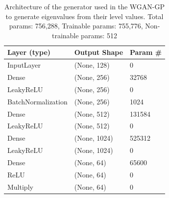 \documentclass{article}
\begin{document}
\begin{table}[]
    \begin{tabular}{|l|l|l|}
        \hline
        \textbf{Layer (type)} & \textbf{Output Shape} & \textbf{Param \#} \\ \hline
        InputLayer            & (None, 128)           & 0                 \\ \hline
        Dense                 & (None, 256)           & 32768             \\ \hline
        LeakyReLU             & (None, 256)           & 0                 \\ \hline
        BatchNormalization    & (None, 256)           & 1024              \\ \hline
        Dense                 & (None, 512)           & 131584            \\ \hline
        LeakyReLU             & (None, 512)           & 0                 \\ \hline
        Dense                 & (None, 1024)          & 525312            \\ \hline
        LeakyReLU             & (None, 1024)          & 0                 \\ \hline
        Dense                 & (None, 64)            & 65600             \\ \hline
        ReLU                  & (None, 64)            & 0                 \\ \hline
        Multiply              & (None, 64)            & 0                 \\ \hline
    \end{tabular}
    \caption{Architecture of the generator used in the WGAN-GP to generate eigenvalues from their level values. Total params: 756,288, Trainable params: 755,776, Non-trainable params: 512}
    \label{tab:evals_dB_generator_WGANGP_architecture}
\end{table}
\end{document}

